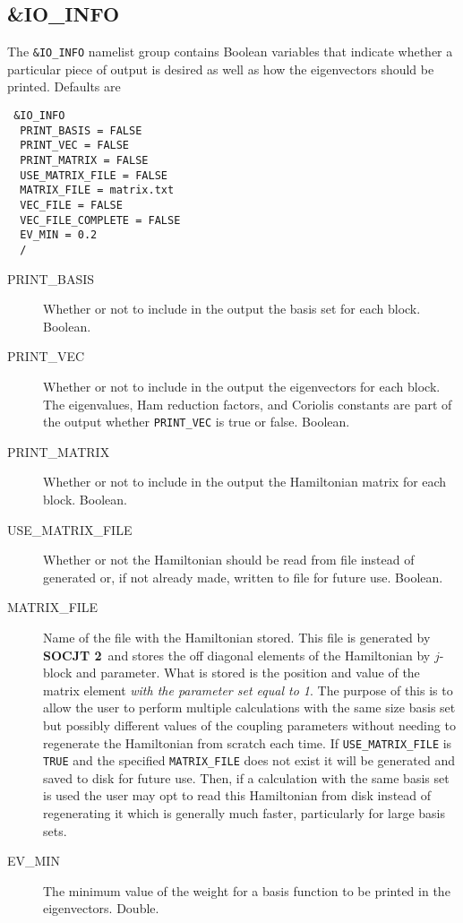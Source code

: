 \documentclass{article}
\newcommand{\socjttwo}{{\bf SOCJT 2}}
\begin{document}
\subsection{\&IO\_INFO}

The {\tt \&IO\_INFO} namelist group contains Boolean variables that
indicate whether a particular piece of output is desired as well
as how the eigenvectors should be printed. Defaults are

\begin{verbatim}
 &IO_INFO
  PRINT_BASIS = FALSE
  PRINT_VEC = FALSE
  PRINT_MATRIX = FALSE
  USE_MATRIX_FILE = FALSE
  MATRIX_FILE = matrix.txt
  VEC_FILE = FALSE
  VEC_FILE_COMPLETE = FALSE
  EV_MIN = 0.2
  /
\end{verbatim}

\begin{description}

\item[PRINT\_BASIS] Whether or not to include in the output the basis
  set for each block. Boolean.

\item[PRINT\_VEC] Whether or not to include in the output the eigenvectors
  for each block. The eigenvalues, Ham reduction factors, and Coriolis
  constants are part of the output whether {\tt PRINT\_VEC} is true or
  false. Boolean.

\item[PRINT\_MATRIX] Whether or not to include in the output the Hamiltonian
  matrix for each block. Boolean.
  
  \item[USE\_MATRIX\_FILE] Whether or not the Hamiltonian should be read from file instead of generated or, if not already made, written to file for future use. Boolean.
  
  \item[MATRIX\_FILE] Name of the file with the Hamiltonian stored. This file is generated by \socjttwo\ and stores the off diagonal elements of the Hamiltonian by $j$-block and parameter. What is stored is the position and value of the matrix element \emph{with the parameter set equal to 1}. The purpose of this is to allow the user to perform multiple calculations with the same size basis set but possibly different values of the coupling parameters without needing to regenerate the Hamiltonian from scratch each time. If {\tt USE\_MATRIX\_FILE} is {\tt TRUE} and the specified {\tt MATRIX\_FILE} does not exist it will be generated and saved to disk for future use. Then, if a calculation with the same basis set is used the user may opt to read this Hamiltonian from disk instead of regenerating it which is generally much faster, particularly for large basis sets. 
  
\item[EV\_MIN] The minimum value of the weight for a basis function to be 
  printed in the eigenvectors. Double.

\end{description}
\end{document}
